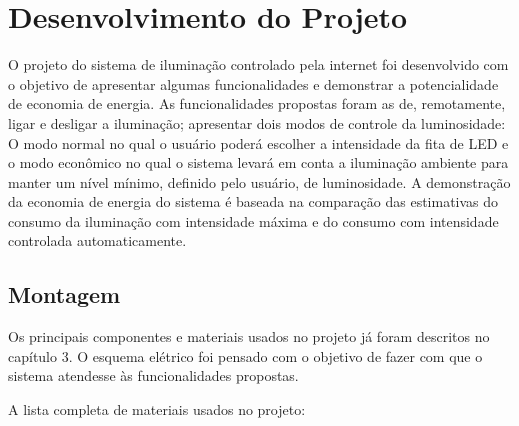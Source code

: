 \chapter{Desenvolvimento do Projeto}

O projeto do sistema de iluminação controlado pela internet foi desenvolvido com o objetivo de apresentar algumas funcionalidades e demonstrar a potencialidade de economia de energia. As funcionalidades propostas foram as de, remotamente, ligar e desligar a iluminação; apresentar dois modos de controle da luminosidade: O modo normal no qual o usuário poderá escolher a intensidade da fita de LED e o modo econômico no qual o sistema levará em conta a iluminação ambiente para manter um nível mínimo, definido pelo usuário, de luminosidade. A demonstração da economia de energia do sistema é baseada na comparação das estimativas do consumo da iluminação com intensidade máxima e do consumo com intensidade controlada automaticamente.

\section{Montagem}

Os principais componentes e materiais usados no projeto já foram descritos no capítulo 3. O esquema elétrico foi pensado com o objetivo de fazer com que o sistema atendesse às funcionalidades propostas.


A lista completa de materiais usados no projeto:

